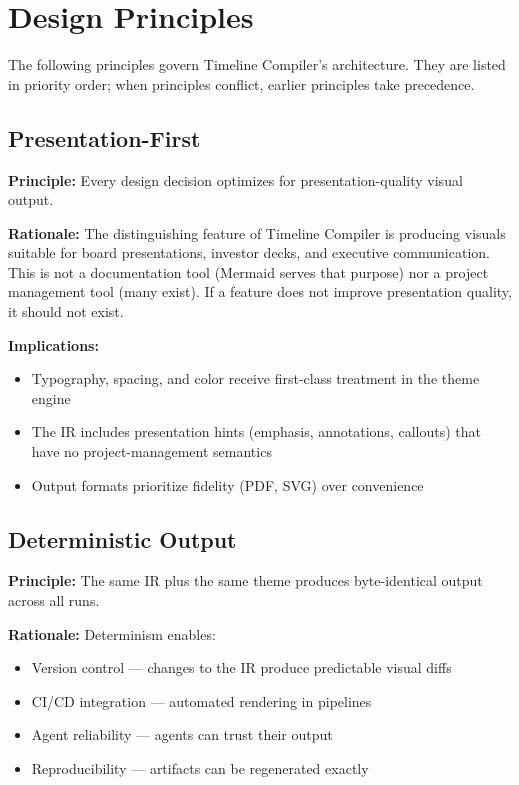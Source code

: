 \section{Design Principles}
\label{sec:principles}

The following principles govern Timeline Compiler's architecture. They are listed in priority order; when principles conflict, earlier principles take precedence.

\subsection{Presentation-First}
\label{principle:presentation-first}

\textbf{Principle:} Every design decision optimizes for presentation-quality visual output.

\textbf{Rationale:} The distinguishing feature of Timeline Compiler is producing visuals suitable for board presentations, investor decks, and executive communication. This is not a documentation tool (Mermaid serves that purpose) nor a project management tool (many exist). If a feature does not improve presentation quality, it should not exist.

\textbf{Implications:}
\begin{itemize}
  \item Typography, spacing, and color receive first-class treatment in the theme engine
  \item The IR includes presentation hints (emphasis, annotations, callouts) that have no project-management semantics
  \item Output formats prioritize fidelity (PDF, SVG) over convenience
\end{itemize}

\subsection{Deterministic Output}
\label{principle:determinism}

\textbf{Principle:} The same IR plus the same theme produces byte-identical output across all runs.

\textbf{Rationale:} Determinism enables:
\begin{itemize}
  \item Version control — changes to the IR produce predictable visual diffs
  \item CI/CD integration — automated rendering in pipelines
  \item Agent reliability — agents can trust their output
  \item Reproducibility — artifacts can be regenerated exactly
\end{itemize}

